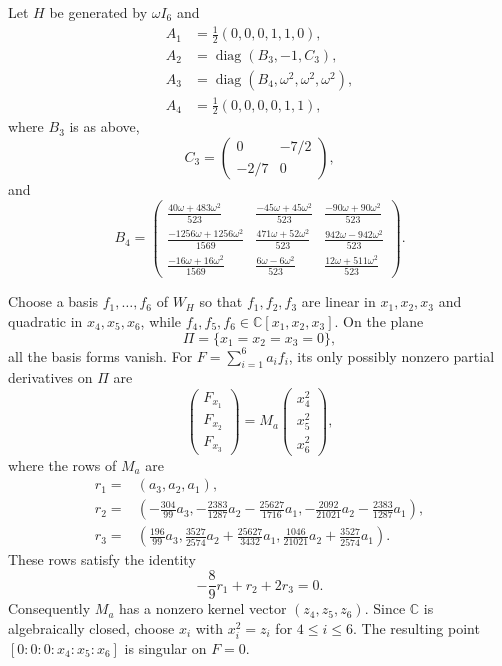 \documentclass[12pt]{amsart}
\numberwithin{equation}{section}
\theoremstyle{plain}
\theoremstyle{definition}
\theoremstyle{remark}
\newcommand{\CC}{\mathbb C}
\DeclareMathOperator{\diag}{diag}
\begin{document}
Let $H$ be generated by $\omega I_6$ and
\begin{align*}
 A_1&=\frac12(0,0,0,1,1,0),\\
 A_2&=\diag(B_3,-1,C_3),\\
 A_3&=\diag(B_4,\omega^2,\omega^2,\omega^2),\\
 A_4&=\frac12(0,0,0,0,1,1),
\end{align*}
where $B_3$ is as above,
\[
 C_3=\begin{pmatrix}0&-7/2\\-2/7&0\end{pmatrix},
\]
and
\[
 B_4=\begin{pmatrix}
 \frac{40\omega+483\omega^2}{523}&
 \frac{-45\omega+45\omega^2}{523}&
 \frac{-90\omega+90\omega^2}{523}\\
 \frac{-1256\omega+1256\omega^2}{1569}&
 \frac{471\omega+52\omega^2}{523}&
 \frac{942\omega-942\omega^2}{523}\\
 \frac{-16\omega+16\omega^2}{1569}&
 \frac{6\omega-6\omega^2}{523}&
 \frac{12\omega+511\omega^2}{523}
 \end{pmatrix}.
\]

Choose a basis $f_1,\ldots,f_6$ of $W_H$ so that $f_1,f_2,f_3$ are
linear in $x_1,x_2,x_3$ and quadratic in $x_4,x_5,x_6$, while
$f_4,f_5,f_6\in\CC[x_1,x_2,x_3]$.  On the plane
\[
 \Pi=\{x_1=x_2=x_3=0\},
\]
all the basis forms vanish.  For $F=\sum_{i=1}^6a_if_i$, its only possibly
nonzero partial derivatives on $\Pi$ are
\[
 \begin{pmatrix}F_{x_1}\\F_{x_2}\\F_{x_3}\end{pmatrix}
 =M_a\begin{pmatrix}x_4^2\\x_5^2\\x_6^2\end{pmatrix},
\]
where the rows of $M_a$ are
\begin{align*}
 r_1={}&(a_3,a_2,a_1),\\
 r_2={}&\left(-\frac{304}{99}a_3,
 -\frac{2383}{1287}a_2-\frac{25627}{1716}a_1,
 -\frac{2092}{21021}a_2-\frac{2383}{1287}a_1\right),\\
 r_3={}&\left(\frac{196}{99}a_3,
 \frac{3527}{2574}a_2+\frac{25627}{3432}a_1,
 \frac{1046}{21021}a_2+\frac{3527}{2574}a_1\right).
\end{align*}
These rows satisfy the identity
\[
 -\frac89r_1+r_2+2r_3=0.
\]
Consequently $M_a$ has a nonzero kernel vector $(z_4,z_5,z_6)$.  Since
$\CC$ is algebraically closed, choose $x_i$ with $x_i^2=z_i$ for
$4\leq i\leq6$.  The resulting point
$[0:0:0:x_4:x_5:x_6]$ is singular on $F=0$.
\end{document}
